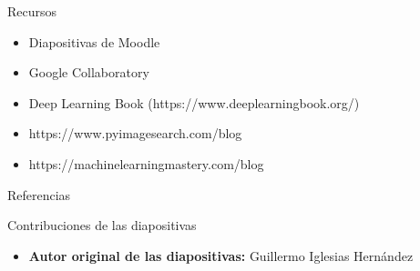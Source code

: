\begin{frame}{Recursos}
\begin{itemize}
    \item Diapositivas de Moodle
    \item Google Collaboratory
    \item Deep Learning Book (https://www.deeplearningbook.org/)
    \item https://www.pyimagesearch.com/blog
    \item https://machinelearningmastery.com/blog
\end{itemize}
\end{frame}


\begin{frame}[allowframebreaks]{Referencias}
    
    
\end{frame}

\begin{frame}{Contribuciones de las diapositivas}
\begin{itemize}
    \item \textbf{Autor original de las diapositivas:} Guillermo Iglesias Hernández
\end{itemize}
\end{frame}

